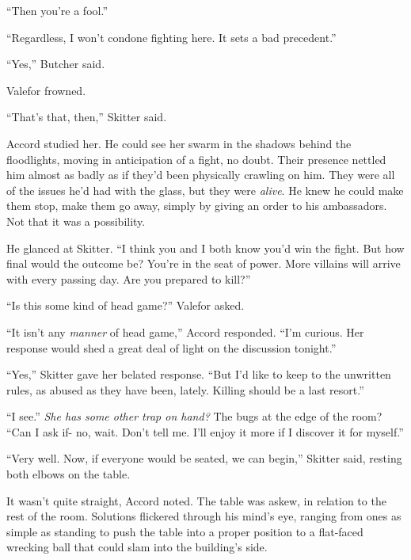 ``Then you're a fool.''



``Regardless, I won't condone fighting here.  It sets a bad precedent.''



``Yes,'' Butcher said.



Valefor frowned.



``That's that, then,'' Skitter said.



Accord studied her.  He could see her swarm in the shadows behind the floodlights, moving in anticipation of a fight, no doubt.  Their presence nettled him almost as badly as if they'd been physically crawling on him.  They were all of the issues he'd had with the glass, but they were \emph{alive}.  He knew he could make them stop, make them go away, simply by giving an order to his ambassadors.  Not that it was a possibility.



He glanced at Skitter.  ``I think you and I both know you'd win the fight.  But how final would the outcome be?  You're in the seat of power.  More villains will arrive with every passing day.  Are you prepared to kill?''



``Is this some kind of head game?'' Valefor asked.



``It isn't any \emph{manner} of head game,'' Accord responded.  ``I'm curious.  Her response would shed a great deal of light on the discussion tonight.''



``Yes,'' Skitter gave her belated response.  ``But I'd like to keep to the unwritten rules, as abused as they have been, lately.  Killing should be a last resort.''



``I see.''  \emph{She has some other trap on hand?}  The bugs at the edge of the room?  ``Can I ask if- no, wait.  Don't tell me.  I'll enjoy it more if I discover it for myself.''



``Very well.  Now, if everyone would be seated, we can begin,'' Skitter said, resting both elbows on the table.  



It wasn't quite straight, Accord noted.  The table was askew, in relation to the rest of the room.  Solutions flickered through his mind's eye, ranging from ones as simple as standing to push the table into a proper position to a flat-faced wrecking ball that could slam into the building's side.



